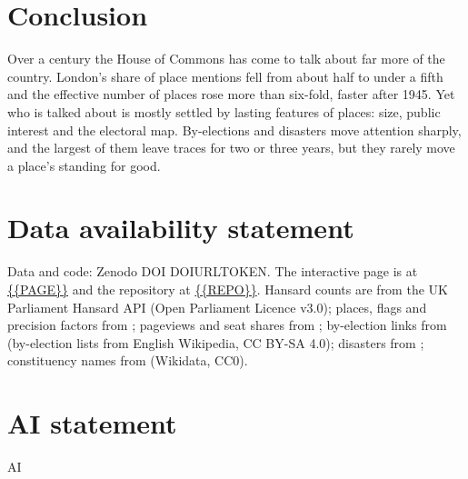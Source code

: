 \documentclass[11pt,a4paper]{article}
\begin{document}
\section{Conclusion}\label{sec:conc}
Over a century the House of Commons has come to talk about far more of the country. London's share of place mentions fell from about half to under a fifth and the effective number of places rose more than six-fold, faster after 1945. Yet who is talked about is mostly settled by lasting features of places: size, public interest and the electoral map. By-elections and disasters move attention sharply, and the largest of them leave traces for two or three years, but they rarely move a place's standing for good.

\section*{Data availability statement}
Data and code: Zenodo DOI DOIURLTOKEN. The interactive page is at \url{{{PAGE}}} and the repository at \url{{{REPO}}}. Hansard counts are from the UK Parliament Hansard API (Open Parliament Licence v3.0); places, flags and precision factors from \citet{hotham2026a}; pageviews and seat shares from \citet{hotham2026b}; by-election links from \citet{hotham2026c} (by-election lists from English Wikipedia, CC BY-SA 4.0); disasters from \citet{hotham2026d}; constituency names from \citet{hotham2026e} (Wikidata, CC0).

\section*{AI statement}
{{AI}}
\end{document}
